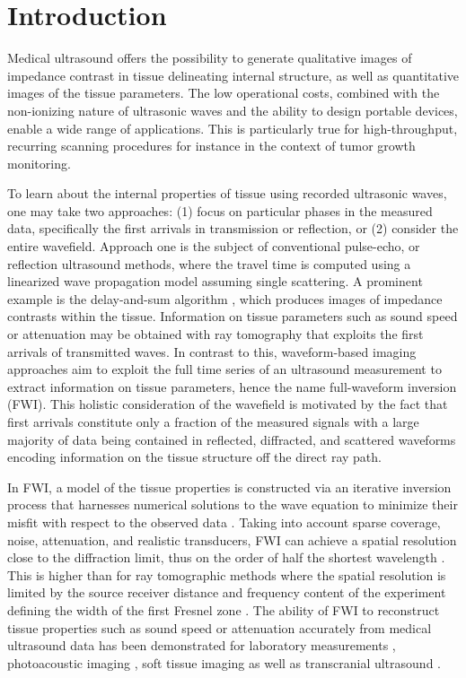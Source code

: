 \documentclass[12pt]{iopart}
\begin{document}
\section{Introduction}
\label{sec:introduction}
Medical ultrasound offers the possibility to generate qualitative images of impedance contrast in tissue delineating internal structure, as well as quantitative images of the tissue parameters. The low operational costs, combined with the non-ionizing nature of ultrasonic waves and the ability to design portable devices, enable a wide range of applications. This is particularly true for high-throughput, recurring scanning procedures for instance in the context of tumor growth monitoring.

To learn about the internal properties of tissue using recorded ultrasonic waves, one may take two approaches: (1) focus on particular phases in the measured data, specifically the first arrivals in transmission or reflection, or (2) consider the entire wavefield. Approach one is the subject of conventional pulse-echo, or reflection ultrasound methods, where the travel time is computed using a linearized wave propagation model assuming single scattering. A prominent example is the delay-and-sum algorithm \cite{Jensen_2006,Gemmeke_2017}, which produces images of impedance contrasts within the tissue. Information on tissue parameters such as sound speed or attenuation may be obtained with ray tomography \cite{Gemmeke_2017} that exploits the first arrivals of transmitted waves. In contrast to this, waveform-based imaging approaches aim to exploit the full time series of an ultrasound measurement to extract information on tissue parameters, hence the name full-waveform inversion (FWI). This holistic consideration of the wavefield is motivated by the fact that first arrivals constitute only a fraction of the measured signals with a large majority of data being contained in reflected, diffracted, and scattered waveforms encoding information on the tissue structure off the direct ray path. 

In FWI, a model of the tissue properties is constructed via an iterative inversion process that harnesses numerical solutions to the wave equation to minimize their misfit with respect to the observed data \cite{Tarantola_1984_2,Virieux_Operto_2009,Fichter_FWI_book_2011}. Taking into account sparse coverage, noise, attenuation, and realistic transducers, FWI can achieve a spatial resolution close to the diffraction limit, thus on the order of half the shortest wavelength \cite{Devaney_1984}. This is higher than for ray tomographic methods where the spatial resolution is limited by the source receiver distance and frequency content of the experiment defining the width of the first Fresnel zone \cite{Schatzberg_Devaney_1992,Cerveny_2001}. The ability of FWI to reconstruct tissue properties such as sound speed or attenuation accurately from medical ultrasound data has been demonstrated for laboratory measurements \cite{KortaMartiartu_2020}, photoacoustic imaging \cite{Huang_2013,Mitsuhasi_2017}, soft tissue imaging \cite{Pratt_Duric_2007,Wiskin_2020} as well as transcranial ultrasound \cite{Guasch_2020,Marty_SPIE_2021,Mitcham_2023}. 
\end{document}
